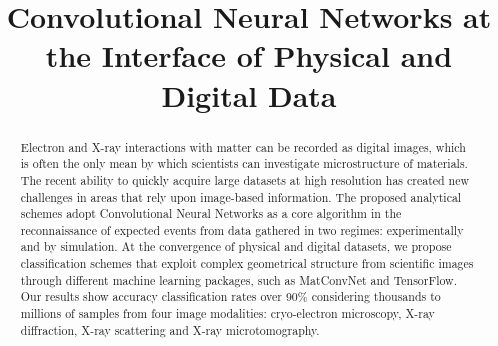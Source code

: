 \documentclass[conference]{IEEEtran}
\begin{document}
%


\title{Convolutional Neural Networks at the Interface of Physical and Digital Data}


\author{
\and
{}
\and
{}
}


\maketitle

\begin{abstract}
Electron and X-ray interactions with matter can be recorded as digital images, which is often the only mean by which scientists can investigate microstructure of materials. The recent ability to quickly acquire large datasets at high resolution has created new challenges in areas that rely upon image-based information. The proposed analytical schemes adopt Convolutional Neural Networks as a core algorithm in the reconnaissance of expected events from data gathered in two regimes: experimentally and by simulation. At the convergence of physical and digital datasets, we propose classification schemes that exploit complex geometrical structure from scientific images through different machine learning packages, such as MatConvNet and TensorFlow. Our results show accuracy classification rates over 90\% considering thousands to millions of samples from four image modalities: cryo-electron microscopy, X-ray diffraction, X-ray scattering and X-ray microtomography.



\end{abstract}
\end{document}
